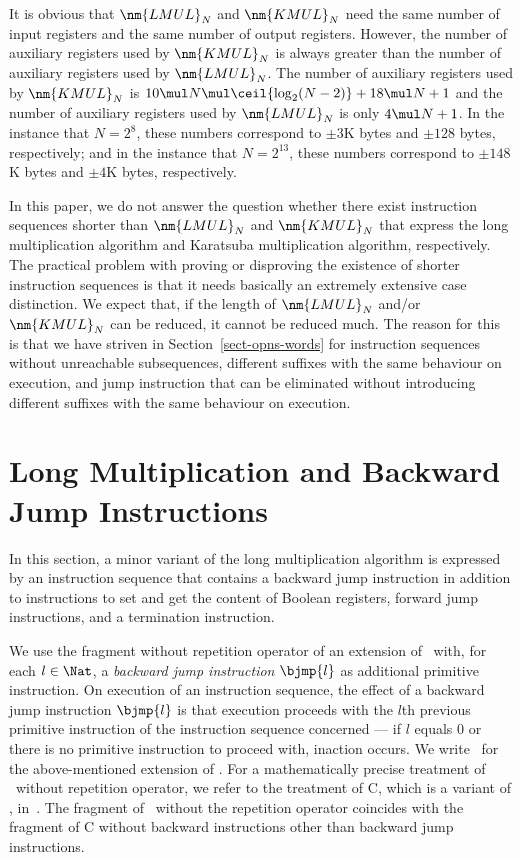 \documentclass{llncs}
\begin{document}
It is obvious that $\nm{LMUL}_N$ and $\nm{KMUL}_N$ need the same number 
of input registers and the same number of output registers. 
However, the number of auxiliary registers used by $\nm{KMUL}_N$ is 
always greater than the number of auxiliary registers used by 
$\nm{LMUL}_N$.
The number of auxiliary registers used by $\nm{KMUL}_N$ is 
$10 \mul N \mul \ceil{\log_2(N - 2)} + 18 \mul N + 1$ 
and the number of auxiliary registers used by $\nm{LMUL}_N$ is only
$4 \mul N + 1$.
In the instance that $N = 2^8$, these numbers correspond to $\pm 3$K 
bytes and $\pm 128$ bytes, respectively; and
in the instance that $N = 2^{13}$, these numbers correspond to 
$\pm 148$K bytes and $\pm 4$K bytes, respectively.

In this paper, we do not answer the question whether there exist 
instruction sequences shorter than $\nm{LMUL}_N$ and $\nm{KMUL}_N$ that 
express the long multiplication algorithm and Karatsuba multiplication 
algorithm, respectively.
The practical problem with proving or disproving the existence of 
shorter instruction sequences is that it needs basically an extremely
extensive case distinction.
We expect that, if the length of $\nm{LMUL}_N$ and/or $\nm{KMUL}_N$ can 
be reduced, it cannot be reduced much. 
The reason for this is that we have striven in 
Section~\ref{sect-opns-words} for instruction sequences without 
unreachable subsequences, different suffixes with the same behaviour on 
execution, and jump instruction that can be eliminated without 
introducing different suffixes with the same behaviour on execution.

\section{Long Multiplication and Backward Jump Instructions}
\label{sect-BJMP}

In this section, a minor variant of the long multiplication algorithm is
expressed by an instruction sequence that contains a backward jump 
instruction in addition to instructions to set and get the content of 
Boolean registers, forward jump instructions, and a termination 
instruction.

We use the fragment without repetition operator of an extension of \PGA\ 
with, for each $l \in \Nat$, a \emph{backward jump instruction} 
$\bjmp{l}$ as additional primitive instruction.
On execution of an instruction sequence, the effect of a backward jump 
instruction $\bjmp{l}$ is that execution proceeds with the $l$th 
previous primitive instruction of the instruction sequence concerned --- 
if $l$ equals $0$ or there is no primitive instruction to proceed with, 
inaction occurs.
We write \PGAbj\ for the above-mentioned extension of \PGA.
For a mathematically precise treatment of \PGAbj\ without repetition 
operator, we refer to the treatment of C, which is a variant of \PGA, 
in~\cite{BP09a}.
The fragment of \PGAbj\ without the repetition operator coincides with 
the fragment of C without backward instructions other than backward jump 
instructions.
\end{document}
